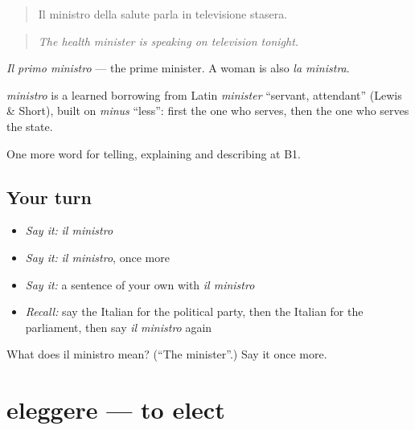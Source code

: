 \begin{quote}
Il ministro della salute parla in televisione stasera.
\end{quote}

\begin{quote}
\emph{The health minister is speaking on television tonight.}
\end{quote}

\emph{Il primo ministro} — the prime minister. A woman is also \emph{la ministra}.

\begin{cousinweb}
\emph{ministro} is a learned borrowing from Latin \emph{minister} \textquotedblleft{}servant, attendant\textquotedblright{} (Lewis \& Short), built on \emph{minus} \textquotedblleft{}less\textquotedblright{}: first the one who serves, then the one who serves the state.
\end{cousinweb}

\begin{grammarlens}[title={What you've built}]
One more word for telling, explaining and describing at B1.
\end{grammarlens}

\subsection*{Your turn}
\begin{itemize}
\raggedright
  \item \emph{Say it:} \emph{il ministro}
  \item \emph{Say it:} \emph{il ministro}, once more
  \item \emph{Say it:} a sentence of your own with \emph{il ministro}
  \item \emph{Recall:} say the Italian for the political party, then the Italian for the parliament, then say \emph{il ministro} again
\end{itemize}

\begin{tcolorbox}[breakable,colback=teal!4,colframe=teal!35!black,title={Before you move on}]
What does il ministro mean? (\textquotedblleft{}The minister\textquotedblright{}.) Say it once more.
\end{tcolorbox}
\section[eleggere]{eleggere — to elect}

\label{lesson:IT-C369-eleggere}



